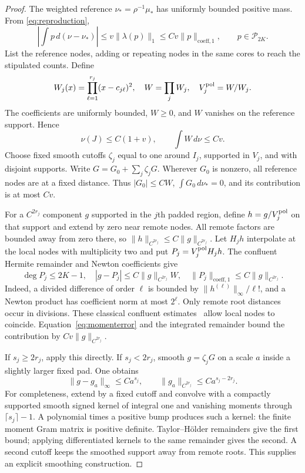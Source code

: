 \documentclass[10pt]{amsart}
\theoremstyle{definition}
\theoremstyle{remark}
\theoremstyle{plain}
\newcommand{\dd}{\,d}
\newcommand{\Pp}{\mathcal P}
\begin{document}
\begin{proof}
The weighted reference $\nu_*=\rho^{-1}\mu_*$ has uniformly bounded positive mass. From \eqref{eq:reproduction},
\begin{equation}\label{eq:momenterror}
 \left|\int p\dd(\nu-\nu_*)\right|\le
 v\|\lambda(p)\|_1\le Cv\|p\|_{\mathrm{coeff},1},\qquad p\in\Pp_{2K}.
\end{equation}
List the reference nodes, adding or repeating nodes in the same cores to reach the stipulated counts. Define
\[
 W_j(x)=\prod_{\ell=1}^{r_j}(x-c_{j\ell})^2,\quad
 W=\prod_jW_j,\quad V_j^{\rm pol}=W/W_j.
\]
The coefficients are uniformly bounded, $W\ge0$, and $W$ vanishes on the reference support. Hence
\begin{equation}\label{eq:massleak}
 \nu(J)\le C(1+v),\qquad \int W\dd\nu\le Cv.
\end{equation}
Choose fixed smooth cutoffs $\zeta_j$ equal to one around $I_j$, supported in $V_j$, and with disjoint supports. Write $G=G_0+\sum_j\zeta_jG$. Wherever $G_0$ is nonzero, all reference nodes are at a fixed distance. Thus $|G_0|\le CW$, $\int G_0\dd\nu_*=0$, and its contribution is at most $Cv$.

For a $C^{2r_j}$ component $g$ supported in the $j$th padded region, define $h=g/V_j^{\rm pol}$ on that support and extend by zero near remote nodes. All remote factors are bounded away from zero there, so $\|h\|_{C^{2r_j}}\le C\|g\|_{C^{2r_j}}$. Let $H_jh$ interpolate at the local nodes with multiplicity two and put $P_j=V_j^{\rm pol}H_jh$. The confluent Hermite remainder and Newton coefficients give
\begin{equation}\label{eq:localfactor}
 \deg P_j\le2K-1,\quad
 |g-P_j|\le C\|g\|_{C^{2r_j}}W,\quad
 \|P_j\|_{\mathrm{coeff},1}\le C\|g\|_{C^{2r_j}}.
\end{equation}
Indeed, a divided difference of order $\ell$ is bounded by $\|h^{(\ell)}\|_\infty/\ell!$, and a Newton product has coefficient norm at most $2^\ell$. Only remote root distances occur in divisions. These classical confluent estimates~\cite{deboor} allow local nodes to coincide. Equation~\eqref{eq:momenterror} and the integrated remainder bound the contribution by $Cv\|g\|_{C^{2r_j}}$.

If $s_j\ge2r_j$, apply this directly. If $s_j<2r_j$, smooth $g=\zeta_jG$ on a scale $a$ inside a slightly larger fixed pad. One obtains
\begin{equation}\label{eq:smoothing}
 \|g-g_a\|_\infty\le Ca^{s_j},\qquad
 \|g_a\|_{C^{2r_j}}\le Ca^{s_j-2r_j}.
\end{equation}
For completeness, extend by a fixed cutoff and convolve with a compactly supported smooth signed kernel of integral one and vanishing moments through $\lceil s_j\rceil-1$. A polynomial times a positive bump produces such a kernel: the finite moment Gram matrix is positive definite. Taylor--H\"older remainders give the first bound; applying differentiated kernels to the same remainder gives the second. A second cutoff keeps the smoothed support away from remote roots. This supplies an explicit smoothing construction.


\end{proof}
\end{document}
